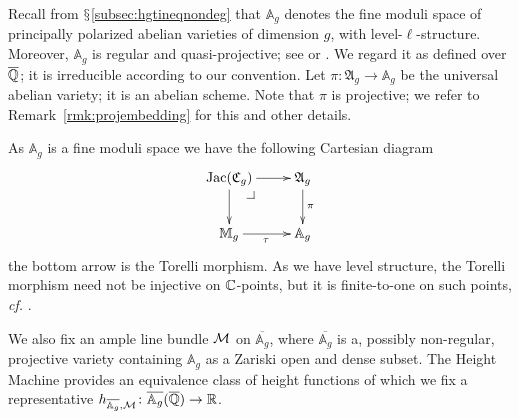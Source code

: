 Recall from $\mathsection$\ref{subsec:hgtineqnondeg} that  $\mathbb{A}_g$ denotes the fine moduli space of principally polarized
abelian varieties of dimension $g$, with level-$\ell$-structure. Moreover,
$\mathbb{A}_g$ is  regular and quasi-projective; see
\cite[Theorem~7.9 and below]{MFK:GIT94} or \cite[Theorem 1.9]{OortSteenbrink}.
We regard it as defined over ${\overline{\mathbb{Q}}}$;
it is irreducible according to
our convention. Let $\pi \colon \mathfrak{A}_g
\rightarrow \mathbb{A}_g$ be the universal abelian variety; it is an
abelian scheme. Note that $\pi$ is projective; we refer to
Remark~\ref{rmk:projembedding} for this and other details.

As $\mathbb{A}_g$ is a fine moduli space we have the following Cartesian diagram
\begin{equation}
\label{EqUnivJac}
\begin{aligned}
\xymatrix{
\mathrm{Jac}(\mathfrak{C}_g) \ar[r] \ar[d]  \pullbackcorner & \mathfrak{A}_g \ar[d]^{\pi} \\
\mathbb{M}_g \ar[r]_{\tau} & \mathbb{A}_g
}
\end{aligned}
\end{equation}
the bottom arrow is the Torelli morphism. As we have level structure,
the Torelli morphism need not be injective on ${\mathbb{C}}$-points, but it is
finite-to-one on such points, \textit{cf.} \cite[Lemma 1.11]{OortSteenbrink}. 




We also fix an ample line bundle ${\mathcal M}$ on $\overline{\mathbb{A}_g}$,
where  $\overline{\mathbb{A}_g}$ is a, possibly non-regular,
projective  variety containing $\mathbb{A}_g$ as a Zariski open and
dense subset. The Height Machine
provides an equivalence class of height functions of which we fix a
representative $h_{\overline{\mathbb{A}_g},{\mathcal M}} \colon
\overline{\mathbb{A}_g}({\overline{\mathbb{Q}}})\rightarrow {\mathbb{R}}$.

